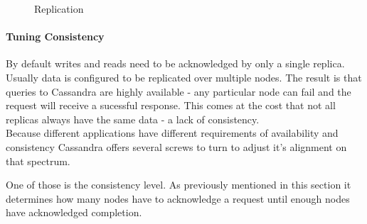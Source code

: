 \begin{figure}[ht]
  \caption{Replication}
  \label{fig:cassandra:replication}
\end{figure}

\paragraph{Tuning Consistency} By default writes and reads need to be acknowledged by only a single replica. Usually data is configured to be replicated over multiple nodes. The result is that queries to Cassandra are highly available - any particular node can fail and the request will receive a sucessful response. This comes at the cost that not all replicas always have the same data - a lack of consistency. \\
Because different applications have different requirements of availability and consistency Cassandra offers several screws to turn to adjust it's alignment on that spectrum.

One of those is the consistency level. As previously mentioned in this section it determines how many nodes have to acknowledge a request until enough nodes have acknowledged completion.

